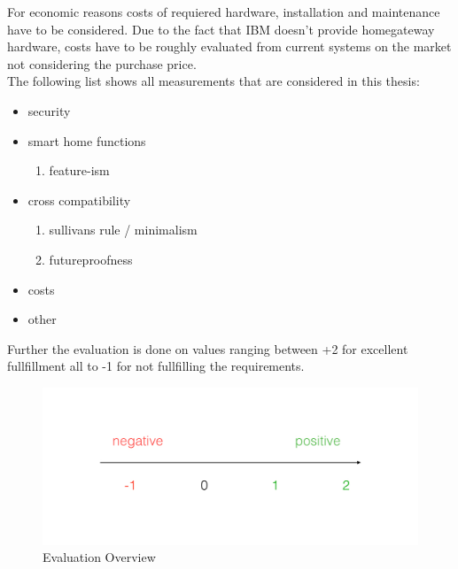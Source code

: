 				For economic reasons costs of requiered hardware, installation and maintenance have to be considered. Due to the fact that IBM doesn't provide homegateway hardware, costs have to be roughly evaluated from current systems on the market not considering the purchase price. %
				\\
				The following list shows all measurements that are considered in this thesis:

				\begin{itemize}
					\item security
					\item smart home functions
						\begin{enumerate}
							\item feature-ism 
						\end{enumerate}
					\item cross compatibility
						\begin{enumerate}
							\item sullivans rule / minimalism
							\item futureproofness
						\end{enumerate}
					\item costs
					\item other
				\end{itemize}


				Further the evaluation is done on values ranging between +2 for excellent fullfillment all to -1 for not fullfilling the requirements.

				\begin{figure}[h]
					\centering
						\includegraphics[width=.9\textwidth]{images/praxis/Evaluation.jpg}
					\caption{Evaluation Overview}
					\label{fig:SmartHomeLandscape}
				\end{figure}
		
